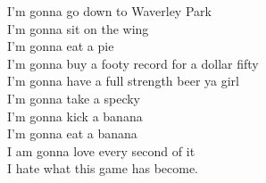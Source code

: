 I'm gonna go down to Waverley Park\\
I'm gonna sit on the wing\\
I'm gonna eat a pie\\
I'm gonna buy a footy record for a dollar fifty\\
I'm gonna have a full strength beer ya girl\\
I'm gonna take a specky\\
I'm gonna kick a banana\\
I'm gonna eat a banana\\
I am gonna love every second of it\\
I hate what this game has become.\\
